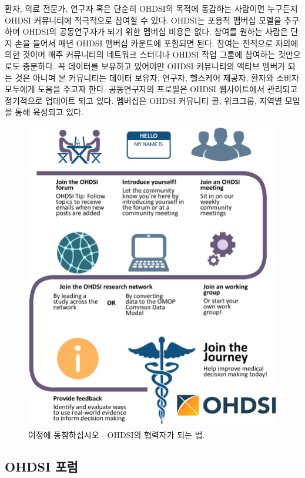 \documentclass[11pt]{book}
\theoremstyle{definition}
\theoremstyle{definition}
\theoremstyle{definition}
\theoremstyle{remark}
\begin{document}
환자, 의료 전문가, 연구자 혹은 단순히 OHDSI의 목적에 동감하는 사람이면
누구든지 OHDSI 커뮤니티에 적극적으로 참여할 수 있다. OHDSI는 포용적
멤버십 모델을 추구하며 OHDSI의 공동연구자가 되기 위한 멤버십 비용은
없다. 참여를 원하는 사람은 단지 손을 들어서 매년 OHDSI 멤버십 카운트에
포함되면 된다. 참여는 전적으로 자의에 의한 것이며 매주 커뮤니티의
네트워크 스터디나 OHDSI 작업 그룹에 참여하는 것만으로도 충분하다. 꼭
데이터를 보유하고 있어야만 OHDSI 커뮤니티의 액티브 멤버가 되는 것은
아니며 본 커뮤니티는 데이터 보유자, 연구자, 헬스케어 제공자, 환자와
소비자 모두에게 도움을 주고자 한다. 공동연구자의 프로필은 OHDSI
웹사이트에서 관리되고 정기적으로 업데이트 되고 있다. 멤버십은 OHDSI
커뮤니티 콜, 워크그룹, 지역별 모임을 통해 육성되고 있다.
  

\begin{figure}

{\centering \includegraphics[width=0.9\linewidth]{images/WhereToBegin/joinTheJourney} 

}

\caption{여정에 동참하십시오 - OHDSI의 협력자가 되는 법.}\label{fig:jointhejourney}
\end{figure}

\hypertarget{ohdsi-}{\subsection{OHDSI 포럼}\label{ohdsi-}}
\end{document}
